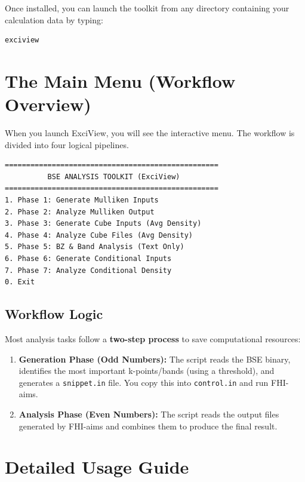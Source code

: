 \documentclass[a4paper,11pt]{article}
\begin{document}
Once installed, you can launch the toolkit from any directory containing your calculation data by typing:
\begin{lstlisting}[language=bash]
exciview
\end{lstlisting}

\section{The Main Menu (Workflow Overview)}
When you launch ExciView, you will see the interactive menu. The workflow is divided into four logical pipelines.

\begin{lstlisting}
==================================================
          BSE ANALYSIS TOOLKIT (ExciView)         
==================================================
1. Phase 1: Generate Mulliken Inputs
2. Phase 2: Analyze Mulliken Output
3. Phase 3: Generate Cube Inputs (Avg Density)
4. Phase 4: Analyze Cube Files (Avg Density)
5. Phase 5: BZ & Band Analysis (Text Only)
6. Phase 6: Generate Conditional Inputs
7. Phase 7: Analyze Conditional Density
0. Exit
\end{lstlisting}

\subsection{Workflow Logic}
Most analysis tasks follow a \textbf{two-step process} to save computational resources:
\begin{enumerate}
    \item \textbf{Generation Phase (Odd Numbers):} The script reads the BSE binary, identifies the most important k-points/bands (using a threshold), and generates a \texttt{snippet.in} file. You copy this into \texttt{control.in} and run FHI-aims.
    \item \textbf{Analysis Phase (Even Numbers):} The script reads the output files generated by FHI-aims and combines them to produce the final result.
\end{enumerate}

\newpage

\section{Detailed Usage Guide}
\end{document}
